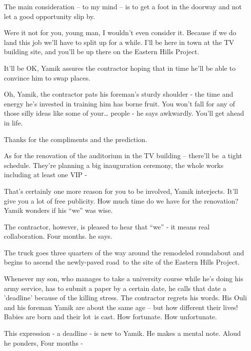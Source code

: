 \documentclass[letterpaper]{article}
\begin{document}
{\textquotedbl}The main consideration -- to my mind -- is to get a foot in the doorway and not let a good opportunity
slip by.{\textquotedbl} 

{\textquotedbl}Were it not for you, young man, I wouldn't even consider it. Because if we do land this job we'll have to
split up for a while. I'll be here in town at the TV building site, and you'll be up there on the Eastern Hills
Project.{\textquotedbl} 

{\textquotedbl}It'll be OK,{\textquotedbl} Yamik assures the contractor hoping that in time he'll be able to convince
him to swap places. ~

{\textquotedbl}Oh, Yamik,{\textquotedbl} the contractor pats his foreman's sturdy shoulder - the time and energy he's
invested in training him has borne fruit. {\textquotedbl}You won't fall for any of those silly ideas like some of
your{\dots} people -{\textquotedbl} he says awkwardly. {\textquotedbl}You'll get ahead in life.{\textquotedbl} 

{\textquotedbl}Thanks for the compliments and the prediction.{\textquotedbl} 

{\textquotedbl}As for the renovation of the auditorium in the TV building -- there'll be~a tight schedule. They're
planning a big inauguration ceremony, the whole works including at least one VIP -{\textquotedbl} 

{\textquotedbl}That's certainly one more reason for you to be involved,{\textquotedbl} Yamik interjects.
{\textquotedbl}It'll give you a lot of free publicity. How much time do we have for the renovation?{\textquotedbl}
Yamik wonders if his ``we'' was wise.

The contractor, however, is pleased to hear that ``we'' - it means real collaboration. {\textquotedbl}Four
months.{\textquotedbl} he says.

The truck goes three quarters of the way around the remodeled roundabout and begins to ascend the newly-paved road~to
the site of the Eastern Hills Project. 

{\textquotedbl}Whenever my son, who manages\textcolor{red}{ }to take a university course while he's doing his army
service, has to submit a paper by a certain date, he calls that date a 'deadline' because of the killing
stress.{\textquotedbl} The contractor regrets his words. His Ouli and his foreman Yamik are about the same age -- but
how different their lives! Babies are born and their lot~is cast. How fortunate. How unfortunate.

This expression - {\textquotedbl}a deadline{\textquotedbl} - is new to Yamik. He makes a mental note. Aloud he ponders,
{\textquotedbl}Four months -{\textquotedbl}
\end{document}
